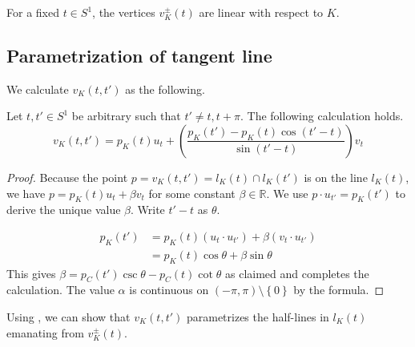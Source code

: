 \begin{corollary}

For a fixed \(t \in S^1\), the vertices \(v_K^{\pm}(t)\) are linear with respect to \(K\).

\label{cor:vertex-linear}
\end{corollary}

\subsection{Parametrization of tangent line}

We calculate \(v_K(t, t')\) as the following.

\begin{lemma}

Let \(t, t' \in S^1\) be arbitrary such that \(t' \neq t, t + \pi\). The following calculation holds.
\[
v_K(t, t') = p_K(t) u_{t} + \left( \frac{p_K(t') - p_K(t) \cos (t' - t)}{\sin (t' - t)} \right)  v_{t}
\]

\label{lem:intersection-tangent-lines}
\end{lemma}

\begin{proof}
Because the point \(p = v_K(t, t') = l_{K}(t) \cap l_K(t')\) is on the line \(l_K(t)\), we have \(p = p_K(t) u_{t} + \beta v_{t}\) for some constant \(\beta \in \mathbb{R}\). We use \(p \cdot u_{t'} = p_K(t')\) to derive the unique value \(\beta\). Write \(t' - t\) as \(\theta\).

\begin{align*}
p_K(t') &= p_K(t) (u_{t} \cdot u_{t'}) + \beta (v_{t} \cdot u_{t'}) \\
&= p_K(t) \cos \theta + \beta \sin \theta
\end{align*}
This gives \(\beta = p_C(t') \csc \theta - p_C(t) \cot \theta\) as claimed and completes the calculation. The value \(\alpha\) is continuous on \((-\pi, \pi) \setminus \left\{ 0 \right\}\) by the formula.
\end{proof}

Using , we can show that \(v_K(t, t')\) parametrizes the half-lines in \(l_K(t)\) emanating from \(v_K^{\pm}(t)\).


